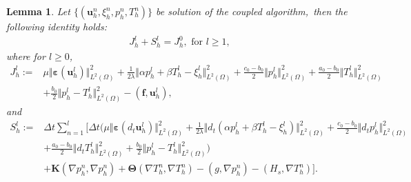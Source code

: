 \documentclass{article}
\newtheorem{lemma}{Lemma}[section]
\numberwithin{equation}{section}
\begin{document}
\begin{lemma}
Let $\{(\bm u_h^n,\xi_h^n,p_h^n,T_h^n)\}$ be solution of the coupled algorithm,~then the following identity holds:
\begin{equation}\label{J_h^l+S_h^l=J_h^0}
\begin{aligned} 
J_h^l+S_h^l=J_h^0, \text{ for  } l\ge 1,
\end{aligned}
\end{equation} 
where for $l\ge 0$,
\begin{equation}  
\begin{aligned} 
J_h^l:=&\mu\Vert\bm\varepsilon(\bm u_h^l)\Vert_{L^2(\Omega)}^2+\frac1{2\lambda}\Vert\alpha p_h^l+\beta T_h^l-\xi_h^l\Vert_{L^2(\Omega)}^2
  +\frac{c_0-b_0}{2}\Vert p_h^l\Vert_{L^2(\Omega)}^2+\frac{a_0-b_0}{2}\Vert T_h^l\Vert_{L^2(\Omega)}^2\\
  &+\frac{b_0}{2}\Vert p_h^l-T_h^l\Vert_{L^2(\Omega)}^2-(\bm f,\bm u_h^l),
\end{aligned}
\end{equation} 
and
\begin{equation}  
\begin{aligned} 
S_h^l:= &\Delta t\sum_{n=1}^l\Big[\Delta t\Big(\mu\Vert \bm\varepsilon(d_t\bm u_h^l)\Vert_{L^2(\Omega)}^2
+\frac1{2\lambda}\Vert d_t(\alpha p_h^l+\beta T_h^l-\xi_h^l)\Vert_{L^2(\Omega)}^2
  +\frac{c_0-b_0}{2}\Vert d_t p_h^l\Vert_{L^2(\Omega)}^2\\
  &+\frac{a_0-b_0}{2}\Vert d_t T_h^l\Vert_{L^2(\Omega)}^2
  +\frac{b_0}{2}\Vert p_h^l-T_h^l\Vert_{L^2(\Omega)}^2 \Big)    \\
        &+\bm K(\nabla p_h^n,\nabla p_h^n)+\bm \Theta(\nabla T_h^n,\nabla T_h^n) 
        - (g,\nabla p_h^n)-(H_{s},\nabla T_h^n)\Big].
\end{aligned}
\end{equation} 
\end{lemma}
\end{document}
